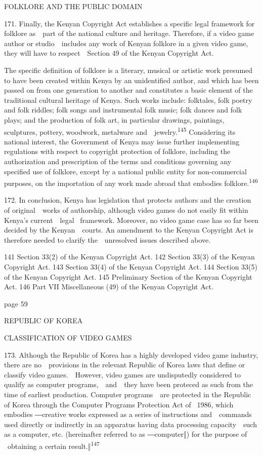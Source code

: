 \documentclass[
]{article}
\begin{document}
{FOLKLORE AND THE PUBLIC DOMAIN}

{171. }{Finally, the Kenyan }{Copyright Act }{establishes a specific
legal framework for folklore as~~part of the national culture and
heritage. Therefore, if a video game author or studio~~includes any work
of Kenyan folklore in a given video game, they will have to
respect~~Section 49 of the Kenyan }{Copyright Act}{.}

{The specific definition of folklore is a literary, musical or artistic
work presumed to have been created within Kenya by an unidentified
author, and which has been passed on from one generation to another and
constitutes a basic element of the traditional cultural heritage of
Kenya. Such works include: folktales, folk poetry and folk riddles; folk
songs and instrumental folk music; folk dances and folk plays; and the
production of folk art, in particular drawings, paintings, sculptures,
pottery, woodwork, metalware and~~jewelry.}\textsuperscript{{145
}}{Considering its national interest, the Government of Kenya may issue
further implementing regulations with respect to copyright protection of
folklore, including the authorization and prescription of the terms and
conditions governing any specified use of folklore, except by a national
public entity for non-commercial purposes, on the importation of any
work made abroad that embodies folklore.}\textsuperscript{{146}}

{172. }{In conclusion, Kenya has legislation that protects authors and
the creation of original~~works of au}{thorship, although video games do
not easily fit within Kenya's current~~legal }{~framework. Moreover, no
video game case has so far been decided by the Kenyan~~courts. An
amendment to the Kenyan }{Copyright Act }{is therefore needed to clarify
the~~unresolved issues described above.}

{141 }{Section 33(2) of the Kenyan }{Copyright Act}{. }{142 }{Section
33(3) of the Kenyan }{Copyright Act}{. }{143 }{Section 33(4) of the
Kenyan }{Copyright Act}{. }{144 }{Section 33(5) of the Kenyan
}{Copyright Act}{. }{145 }{Preliminary Section of the Kenyan }{Copyright
Act}{. }{146 }{Part VII Miscellaneous (49) of the Kenyan }{Copyright
Act}{.}

{page 59}

{REPUBLIC OF KOREA}

{CLASSIFICATION OF VIDEO GAMES}

{173. }{Although the Republic of Korea has a highly developed video game
industry, there are no~~provisions in the relevant Republic of Korea
laws that define or classify }{video games}{.~~However, video games are
undisputedly considered to qualify as computer programs,~~and~~they have
been proteced as such from the time of earliest production. Computer
programs~~are protected in the Republic of Korea through the }{Computer
Programs Protection Act }{of }{~1986, which embodies ―}{creative works
expressed as a series of instructions and~~commands used directly or
indirectly in an apparatus having data processing capacity~~such as a
computer, etc. }{(hereinafter referred to as ―computer‖) for the purpose
of }{~obtaining a certain result}{.‖}\textsuperscript{{147}}
\end{document}
